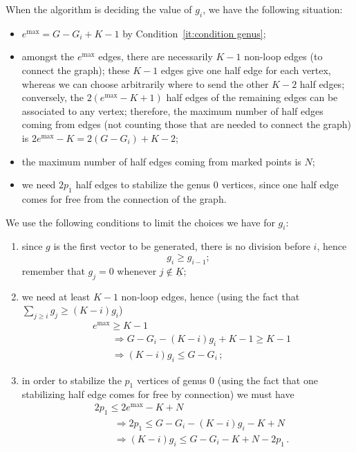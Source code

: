 \documentclass{amsart}
\theoremstyle{plain}
\theoremstyle{definition}
\DeclareMathOperator{\MAX}{max}
\newcommand{\ubar}[1]{\underline{#1}}
\begin{document}
When the algorithm is deciding the value of $g_i$, we have the
following situation:
\begin{itemize}
\item $e^{\MAX} = G - G_i + K - 1$ by Condition~\ref{it:condition genus};
\item amongst the $e^{\MAX}$ edges, there are necessarily $K-1$
  non-loop edges (to connect the graph); these $K-1$ edges give one
  half edge for each vertex, whereas we can choose arbitrarily where
  to send the other $K-2$ half edges; conversely, the $2(e^{\MAX} - K
  +1)$ half edges of the remaining edges can be associated to any
  vertex; therefore, the maximum number of half edges coming from
  edges (not counting those that are needed to connect the graph) is
  $2e^{\MAX} - K = 2(G - G_i) + K - 2$;
\item the maximum number of half edges coming from marked points is
  $N$;
\item we need $2p_1$ half edges to stabilize the genus $0$ vertices,
  since one half edge comes for free from the connection of the graph.
\end{itemize}

We use the following conditions to limit the choices we have for
$g_i$:
\begin{enumerate}
\item since $g$ is the first vector to be generated, there is no
  division before $i$, hence
  \[
  g_i \geq g_{i-1}\text{;}
  \]
  remember that $g_j = 0$ whenever $j \not\in \ubar{K}$;
\item we need at least $K-1$ non-loop edges, hence (using the fact
  that $\sum_{j \geq i} g_j \geq (K-i) g_i$)
  \begin{align*}
    &e^{\MAX} \geq K-1\\
    &\qquad\Rightarrow G - G_i - (K-i) g_i + K-1 \geq K-1\\
    &\qquad\Rightarrow (K-i)g_i \leq G - G_i\,\text{;}
  \end{align*}
\item in order to stabilize the $p_1$ vertices of genus $0$ (using the
  fact that one stabilizing half edge comes for free by connection) we
  must have
  \begin{align*}
    &2 p_1 \leq 2e^{\MAX} - K + N\\
    &\qquad\Rightarrow 2p_1 \leq G - G_i - (K-i)g_i - K + N\\
    &\qquad\Rightarrow (K-i)g_i \leq G - G_i - K + N - 2p_1\,\text{.}
  \end{align*}
\end{enumerate}
\end{document}
